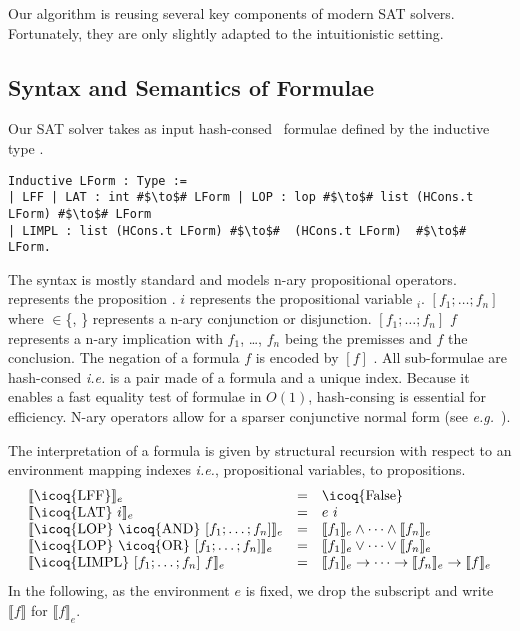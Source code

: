 \documentclass[utf8,a4paper,UKenglish,cleveref, autoref, thm-restate]{lipics-v2021}
\newcommand{\mcoq}[1]{\mbox{\icoq{#1}}}
\begin{document}
Our algorithm is reusing several key components of modern SAT
solvers. Fortunately, they are only slightly adapted to the
intuitionistic setting.

\subsection{Syntax and Semantics of Formulae}
\label{sec:syntax}
Our SAT solver takes as input hash-consed~\cite{Allen-hcons} formulae defined by the inductive type .
\begin{verbatim}
Inductive LForm : Type :=
| LFF | LAT : int #$\to$# LForm | LOP : lop #$\to$# list (HCons.t LForm) #$\to$# LForm
| LIMPL : list (HCons.t LForm) #$\to$#  (HCons.t LForm)  #$\to$# LForm.
\end{verbatim}
The syntax is mostly standard and models n-ary propositional operators.
%
 represents the proposition . 
 $i$ represents the propositional variable $_i$.
%
 $[f_1; \dots; f_n]$ where  $\in$\{,
\} represents a n-ary conjunction or disjunction.
%
 $[f_1; \dots; f_n]$ $f$ represents a n-ary implication
with $f_1$, \dots, $f_n$ being the premisses and $f$ the conclusion.
%
The negation of a formula $f$ is encoded by  $[f]$ .
%
All sub-formulae are hash-consed \emph{i.e.} 
is a pair made of a formula and a unique index.
%
Because it enables a fast equality test of formulae in $O(1)$, hash-consing is essential for efficiency.
%
N-ary operators allow for a sparser conjunctive normal form (see \emph{e.g.}~\cite{LescuyerC09}).

The interpretation of a formula  is given by structural recursion with respect
to an environment  mapping indexes \emph{i.e.}, propositional variables, to
propositions.
\[
  \begin{array}{lcl}
    \llbracket \mcoq{LFF} \rrbracket_e &=& \mcoq{False} \\
    \llbracket \mcoq{LAT}\ i \rrbracket_e &=& e\ i \\
    \llbracket \mcoq{LOP}\  \mcoq{AND}\ [f_1;\dots;f_n] \rrbracket_e &=& \llbracket f_1 \rrbracket_e \land \dots\land \llbracket f_n \rrbracket_e\\
    \llbracket \mcoq{LOP}\  \mcoq{OR}\  [f_1;\dots;f_n] \rrbracket_e &=& %
    \llbracket f_1 \rrbracket_e \vee \dots\vee \llbracket f_n \rrbracket_e\\
    \llbracket \mcoq{LIMPL}\ [f_1;\dots;f_n]\  f \rrbracket_e &=& \llbracket f_1\rrbracket_e \rightarrow \dots \rightarrow \llbracket f_n \rrbracket_e \to \llbracket f \rrbracket_e \\
  \end{array}
\]
In the following, as the environment $e$ is fixed, we drop the
subscript and write $\llbracket f \rrbracket$ for $\llbracket f \rrbracket_e$.
\end{document}
